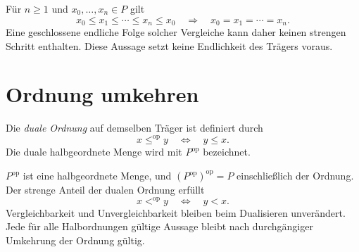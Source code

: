 \begin{theorem}
\label{b12guide:thm:cycles}
Für $n\geq1$ und $x_0,\ldots,x_n\in P$ gilt
\[
 x_0\leq x_1\leq\cdots\leq x_n\leq x_0
 \quad\Longrightarrow\quad x_0=x_1=\cdots=x_n.
\]
Eine geschlossene endliche Folge solcher Vergleiche kann daher
keinen strengen Schritt enthalten. Diese Aussage setzt keine
Endlichkeit des Trägers voraus.
\end{theorem}

\section{Ordnung umkehren}

\begin{definition}\label{b12guide:def:dual}
Die \emph{duale Ordnung} auf demselben Träger ist definiert durch
\[
 x\leq^{\mathrm{op}}y\quad\Longleftrightarrow\quad y\leq x.
\]
Die duale halbgeordnete Menge wird mit $P^{\mathrm{op}}$ bezeichnet.
\end{definition}

\begin{theorem}[Dualität]\label{b12guide:thm:duality}
$P^{\mathrm{op}}$ ist eine halbgeordnete Menge, und
$(P^{\mathrm{op}})^{\mathrm{op}}=P$ einschließlich der Ordnung.
Der strenge Anteil der dualen Ordnung erfüllt
\[
 x<^{\mathrm{op}}y\quad\Longleftrightarrow\quad y<x.
\]
Vergleichbarkeit und Unvergleichbarkeit bleiben beim Dualisieren
unverändert. Jede für alle Halbordnungen gültige Aussage bleibt
nach durchgängiger Umkehrung der Ordnung gültig.
\end{theorem}
